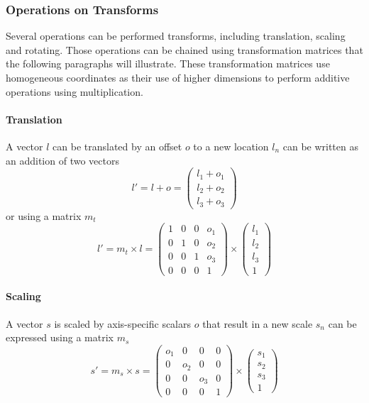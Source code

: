 \subsubsection{Operations on Transforms}
Several operations can be performed transforms, including translation, scaling and rotating. Those operations can be chained using transformation matrices that the following paragraphs will illustrate. These transformation matrices use homogeneous coordinates as their use of higher dimensions to perform additive operations using multiplication. \cite{10.1007/978-1-4471-6290-2}
\paragraph{Translation} A vector $l$ can be translated by an offset $o$ to a new location $l_n$ can be written as an addition of two vectors
\begin{equation}
    l' = l + o = \begin{pmatrix}l_{1} + o_1\\l_{2}+ o_{2}\\l_{3} + o_{3}\end{pmatrix}
\end{equation}
or using a matrix $m_t$
\begin{equation}
    l' = m_t \times l =\begin{pmatrix}
        1 & 0 & 0 & o_1\\
        0 & 1 & 0 & o_2\\
        0 & 0 & 1 & o_3\\
        0 & 0 & 0 & 1
    \end{pmatrix} \times  \begin{pmatrix}l_1 \\ l_2 \\ l_3 \\ 1\end{pmatrix}
    \label{eq:matrix-translate}
\end{equation}
\paragraph{Scaling} A vector $s$ is scaled by axis-specific scalars $o$ that result in a new scale $s_n$ can be expressed using a matrix $m_s$
\begin{equation}
    s' = m_s \times s = \begin{pmatrix}
        o_1 & 0 & 0 & 0\\
        0 & o_2 & 0 & 0\\
        0 & 0 & o_3 & 0\\
        0 & 0 & 0 & 1
    \end{pmatrix} \times \begin{pmatrix}s_1 \\ s_2 \\ s_3 \\ 1\end{pmatrix}
    \label{eq:matrix-scale}
\end{equation}
